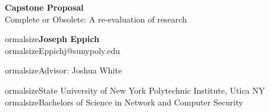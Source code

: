 \documentclass{article}
\begin{document}
	\begin{center}
    
    
		\LARGE{\textbf{Capstone Proposal}} \\
        \vspace{1em}
        \Large{Complete or Obsolete: A re-evaluation of research} \\
        \vspace{1em}
        
ormalsize\textbf{Joseph Eppich} \\
        
ormalsize{Eppichj@sunypoly.edu} \\
        \vspace{1em}
        
ormalsize{Advisor: Joshua White} \\
        \vspace{1em}
        
ormalsize{State University of New York Polytechnic Institute, Utica NY} \\
        
ormalsize{Bachelors of Science in Network and Computer Security}
     
	\end{center}
\end{document}
